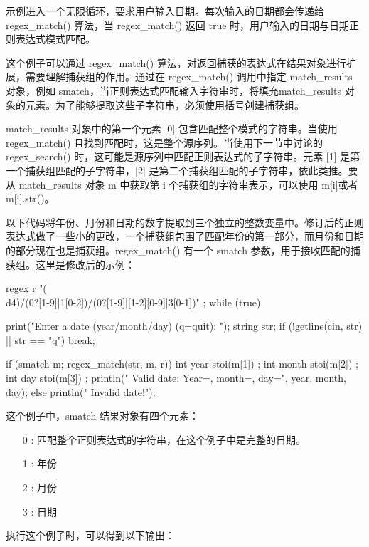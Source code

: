 示例进入一个无限循环，要求用户输入日期。每次输入的日期都会传递给 regex\_match() 算法，当 regex\_match() 返回 true 时，用户输入的日期与日期正则表达式模式匹配。

这个例子可以通过 regex\_match() 算法，对返回捕获的表达式在结果对象进行扩展，需要理解捕获组的作用。通过在 regex\_match() 调用中指定 match\_results 对象，例如 smatch，当正则表达式匹配输入字符串时，将填充match\_results 对象的元素。为了能够提取这些子字符串，必须使用括号创建捕获组。

match\_results 对象中的第一个元素 [0] 包含匹配整个模式的字符串。当使用 regex\_match() 且找到匹配时，这是整个源序列。当使用下一节中讨论的 regex\_search() 时，这可能是源序列中匹配正则表达式的子字符串。元素 [1] 是第一个捕获组匹配的子字符串，[2] 是第二个捕获组匹配的子字符串，依此类推。要从 match\_results 对象 m 中获取第 i 个捕获组的字符串表示，可以使用 m[i]或者 m[i].str()。

以下代码将年份、月份和日期的数字提取到三个独立的整数变量中。修订后的正则表达式做了一些小的更改，一个捕获组包围了匹配年份的第一部分，而月份和日期的部分现在也是捕获组。regex\_match() 有一个 smatch 参数，用于接收匹配的捕获组。这里是修改后的示例：

\begin{cpp}
regex r { "(\\d{4})/(0?[1-9]|1[0-2])/(0?[1-9]|[1-2][0-9]|3[0-1])" };
while (true) {
    print("Enter a date (year/month/day) (q=quit): ");
    string str;
    if (!getline(cin, str) || str == "q") { break; }

    if (smatch m; regex_match(str, m, r)) {
        int year { stoi(m[1]) };
        int month { stoi(m[2]) };
        int day { stoi(m[3]) };
        println(" Valid date: Year={}, month={}, day={}", year, month, day);
    } else {
        println(" Invalid date!");
    }
}
\end{cpp}

这个例子中，smatch 结果对象有四个元素：

\begin{itemize}
\item
[0]: 匹配整个正则表达式的字符串，在这个例子中是完整的日期。

\item
[1]: 年份

\item
[2]: 月份

\item
[3]: 日期
\end{itemize}

执行这个例子时，可以得到以下输出：

